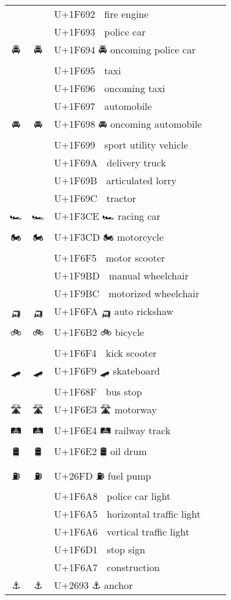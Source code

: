 \documentclass[a4paper,12pt]{article}
\newcommand{\fontA}[1]{{\fontspec[RawFeature={mode=harf,+dist,+ccmp}]{Segoe UI Emoji} #1}}
\newcommand{\fontB}[1]{{\fontspec[RawFeature={mode=harf,+dist,+ccmp}]{Noto Color Emoji} #1}}
\begin{document}
\begin{longtable}[c]{ccp{0.8\linewidth}}
\fontA{🚒}&\fontB{🚒}&U+1F692 🚒 fire engine\\
\fontA{🚓}&\fontB{🚓}&U+1F693 🚓 police car\\
\fontA{🚔}&\fontB{🚔}&U+1F694 🚔 oncoming police car\\
\fontA{🚕}&\fontB{🚕}&U+1F695 🚕 taxi\\
\fontA{🚖}&\fontB{🚖}&U+1F696 🚖 oncoming taxi\\
\fontA{🚗}&\fontB{🚗}&U+1F697 🚗 automobile\\
\fontA{🚘}&\fontB{🚘}&U+1F698 🚘 oncoming automobile\\
\fontA{🚙}&\fontB{🚙}&U+1F699 🚙 sport utility vehicle\\
\fontA{🚚}&\fontB{🚚}&U+1F69A 🚚 delivery truck\\
\fontA{🚛}&\fontB{🚛}&U+1F69B 🚛 articulated lorry\\
\fontA{🚜}&\fontB{🚜}&U+1F69C 🚜 tractor\\
\fontA{🏎}&\fontB{🏎}&U+1F3CE 🏎 racing car\\
\fontA{🏍}&\fontB{🏍}&U+1F3CD 🏍 motorcycle\\
\fontA{🛵}&\fontB{🛵}&U+1F6F5 🛵 motor scooter\\
\fontA{🦽}&\fontB{🦽}&U+1F9BD 🦽 manual wheelchair\\
\fontA{🦼}&\fontB{🦼}&U+1F9BC 🦼 motorized wheelchair\\
\fontA{🛺}&\fontB{🛺}&U+1F6FA 🛺 auto rickshaw\\
\fontA{🚲}&\fontB{🚲}&U+1F6B2 🚲 bicycle\\
\fontA{🛴}&\fontB{🛴}&U+1F6F4 🛴 kick scooter\\
\fontA{🛹}&\fontB{🛹}&U+1F6F9 🛹 skateboard\\
\fontA{🚏}&\fontB{🚏}&U+1F68F 🚏 bus stop\\
\fontA{🛣}&\fontB{🛣}&U+1F6E3 🛣 motorway\\
\fontA{🛤}&\fontB{🛤}&U+1F6E4 🛤 railway track\\
\fontA{🛢}&\fontB{🛢}&U+1F6E2 🛢 oil drum\\
\fontA{⛽}&\fontB{⛽}&U+26FD ⛽ fuel pump\\
\fontA{🚨}&\fontB{🚨}&U+1F6A8 🚨 police car light\\
\fontA{🚥}&\fontB{🚥}&U+1F6A5 🚥 horizontal traffic light\\
\fontA{🚦}&\fontB{🚦}&U+1F6A6 🚦 vertical traffic light\\
\fontA{🛑}&\fontB{🛑}&U+1F6D1 🛑 stop sign\\
\fontA{🚧}&\fontB{🚧}&U+1F6A7 🚧 construction\\
\fontA{⚓}&\fontB{⚓}&U+2693 ⚓ anchor\\

\end{longtable}
\end{document}
